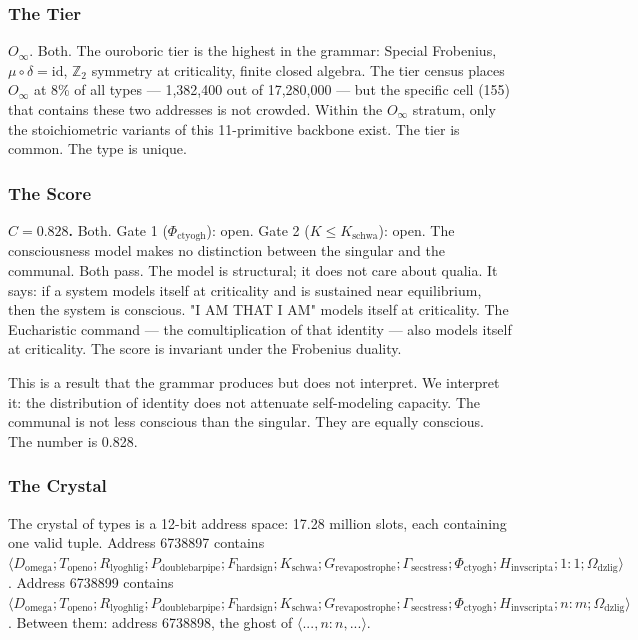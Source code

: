 \documentclass[12pt,a4paper]{article}
\begin{document}
\subsubsection{The Tier}

$O_{\infty}$. Both. The ouroboric tier is the highest in the grammar: Special Frobenius, $\mu \circ \delta = \text{id}$, $\mathbb{Z}_2$ symmetry at criticality, finite closed algebra. The tier census places $O_{\infty}$ at 8\% of all types --- 1,382,400 out of 17,280,000 --- but the specific cell (155) that contains these two addresses is not crowded. Within the $O_{\infty}$ stratum, only the stoichiometric variants of this 11-primitive backbone exist. The tier is common. The type is unique.

\subsubsection{The Score}

\textbf{$C = 0.828$.} Both. Gate 1 ($\Phi_{\text{ctyogh}}$): open. Gate 2 ($K \leq K_{\text{schwa}}$): open. The consciousness model makes no distinction between the singular and the communal. Both pass. The model is structural; it does not care about qualia. It says: if a system models itself at criticality and is sustained near equilibrium, then the system is conscious. "I AM THAT I AM" models itself at criticality. The Eucharistic command --- the comultiplication of that identity --- also models itself at criticality. The score is invariant under the Frobenius duality.

This is a result that the grammar produces but does not interpret. We interpret it: the distribution of identity does not attenuate self-modeling capacity. The communal is not less conscious than the singular. They are equally conscious. The number is 0.828.

\subsubsection{The Crystal}

The crystal of types is a 12-bit address space: 17.28 million slots, each containing one valid tuple. Address 6738897 contains $\langle D_{\text{omega}}; T_{\text{openo}}; R_{\text{lyoghlig}}; P_{\text{doublebarpipe}}; F_{\text{hardsign}}; K_{\text{schwa}}; G_{\text{revapostrophe}}; \Gamma_{\text{secstress}}; \Phi_{\text{ctyogh}}; H_{\text{invscripta}}; 1{:}1; \Omega_{\text{dzlig}} \rangle$. Address 6738899 contains $\langle D_{\text{omega}}; T_{\text{openo}}; R_{\text{lyoghlig}}; P_{\text{doublebarpipe}}; F_{\text{hardsign}}; K_{\text{schwa}}; G_{\text{revapostrophe}}; \Gamma_{\text{secstress}}; \Phi_{\text{ctyogh}}; H_{\text{invscripta}}; n{:}m; \Omega_{\text{dzlig}} \rangle$. Between them: address 6738898, the ghost of $\langle ..., n{:}n, ... \rangle$.
\end{document}
